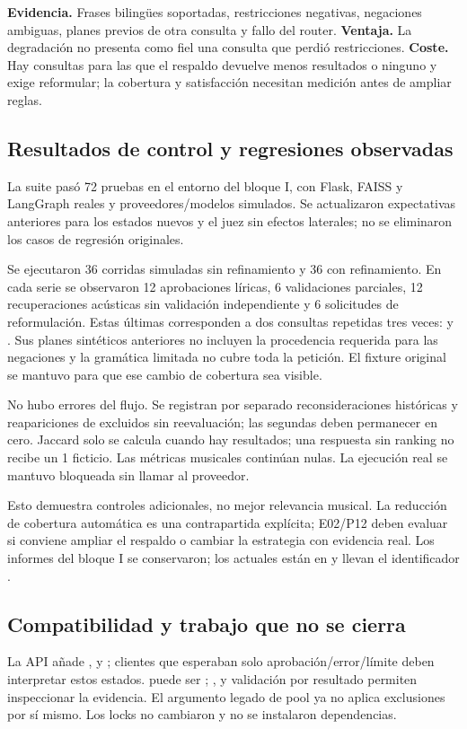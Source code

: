 \textbf{Evidencia.} Frases bilingües soportadas, restricciones negativas,
negaciones ambiguas, planes previos de otra consulta y fallo del router.
\textbf{Ventaja.} La degradación no presenta como fiel una consulta que perdió
restricciones. \textbf{Coste.} Hay consultas para las que el respaldo devuelve
menos resultados o ninguno y exige reformular; la cobertura y satisfacción
necesitan medición antes de ampliar reglas.

\subsection{Resultados de control y regresiones observadas}
La suite pasó 72 pruebas en el entorno del bloque I, con Flask, FAISS y
LangGraph reales y proveedores/modelos simulados. Se actualizaron expectativas
anteriores para los estados nuevos y el juez sin efectos laterales; no se
eliminaron los casos de regresión originales.

Se ejecutaron 36 corridas simuladas sin refinamiento y 36 con refinamiento.
En cada serie se observaron 12 aprobaciones líricas, 6 validaciones parciales,
12 recuperaciones acústicas sin validación independiente y 6 solicitudes de
reformulación. Estas últimas corresponden a dos consultas repetidas tres veces:
 y . Sus planes sintéticos
anteriores no incluyen la procedencia requerida para las negaciones y la
gramática limitada no cubre toda la petición. El fixture original se mantuvo
para que ese cambio de cobertura sea visible.

No hubo errores del flujo. Se registran por separado reconsideraciones históricas
y reapariciones de excluidos sin reevaluación; las segundas deben permanecer en
cero. Jaccard solo se calcula cuando hay resultados; una respuesta sin ranking
no recibe un 1 ficticio. Las métricas musicales continúan nulas. La ejecución
real se mantuvo bloqueada sin llamar al proveedor.

Esto demuestra controles adicionales, no mejor relevancia musical. La reducción
de cobertura automática es una contrapartida explícita; E02/P12 deben evaluar
si conviene ampliar el respaldo o cambiar la estrategia con evidencia real.
Los informes del bloque I se conservaron; los actuales están en
 y llevan el identificador .

\subsection{Compatibilidad y trabajo que no se cierra}
La API añade ,  y
; clientes que esperaban solo aprobación/error/límite
deben interpretar estos estados.  puede ser
; ,  y validación por resultado
permiten inspeccionar la evidencia. El argumento legado de pool ya no aplica
exclusiones por sí mismo. Los locks no cambiaron y no se instalaron dependencias.


